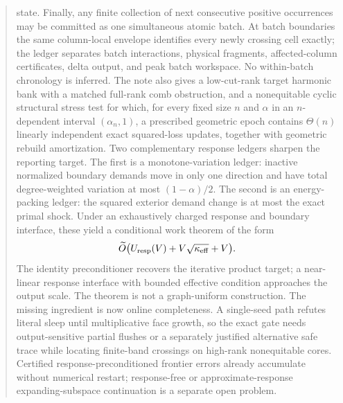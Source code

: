 \documentclass[11pt]{article}
\begin{document}
\begin{abstract}
state.  Finally, any finite collection of next consecutive positive
occurrences may be committed as one simultaneous atomic batch.  At batch
boundaries the same column-local envelope identifies every newly crossing
cell exactly; the ledger separates batch interactions, physical fragments,
affected-column certificates, delta output, and peak batch workspace.  No
within-batch chronology is inferred.  The note also
gives a low-cut-rank target harmonic bank
with a matched full-rank comb
obstruction, and a nonequitable cyclic structural stress test for which, for
every fixed size $n$ and $\alpha$ in an $n$-dependent interval
$(\alpha_n,1)$, a prescribed geometric epoch contains $\Theta(n)$ linearly
independent exact squared-loss updates, together with
geometric rebuild
amortization.  Two
complementary response
ledgers sharpen the reporting target.  The first is a monotone-variation ledger:
inactive normalized boundary demands move in only one direction and have
total degree-weighted variation at most $(1-\alpha)/2$.  The second is an
energy-packing ledger: the squared exterior demand change is
at most the exact primal shock.  Under an exhaustively charged response and
boundary interface, these yield a conditional work
theorem of the form
\[
 \widetilde O\bigl(
 U_{\rm resp}(V)+V\sqrt{\kappa_{\rm eff}}+V
 \bigr).
\]
The identity preconditioner recovers the iterative product target; a
near-linear response interface with bounded effective condition approaches the
output scale.  The theorem is not a graph-uniform construction.  The missing
ingredient is now online completeness.  A single-seed path refutes literal
sleep until multiplicative face growth, so the exact gate needs
output-sensitive partial flushes or a separately justified alternative safe
trace while locating finite-band crossings on high-rank nonequitable cores.
Certified response-preconditioned frontier errors
already accumulate without numerical restart; response-free or
approximate-response expanding-subspace continuation is a separate open
problem.
\end{abstract}

\tableofcontents












\end{document}
